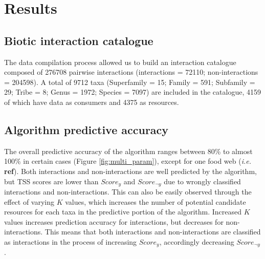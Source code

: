 \documentclass[letterpaper]{article}
\begin{document}

\section{Results}
    \subsection{Biotic interaction catalogue}
The data compilation process allowed us to build an interaction catalogue composed of 276708 pairwise interactions (interactions = 72110; non-interactions = 204598). A total of 9712 taxa (Superfamily = 15; Family = 591; Subfamily = 29; Tribe = 8; Genus = 1972; Species = 7097) are included in the catalogue, 4159 of which have data as consumers and 4375 as resources.

    \subsection{Algorithm predictive accuracy}
The overall predictive accuracy of the algorithm ranges between 80\% to almost 100\% in certain cases (Figure \ref{fig:multi_param}), except for one food web (\textit{i.e.} \textbf{ref}). Both interactions and non-interactions are well predicted by the algorithm, but TSS scores are lower than $Score_y$ and $Score_{\neg y}$ due to wrongly classified interactions and non-interactions. This can also be easily observed through the effect of varying $K$ values, which increases the number of potential candidate resources for each taxa in the predictive portion of the algorithm. Increased $K$ values increases prediction accuracy for interactions, but decreases for non-interactions. This means that both interactions and non-interactions are classified as interactions in the process of increasing $Score_y$, accordingly decreasing $Score_{\neg y}$.
\end{document}
